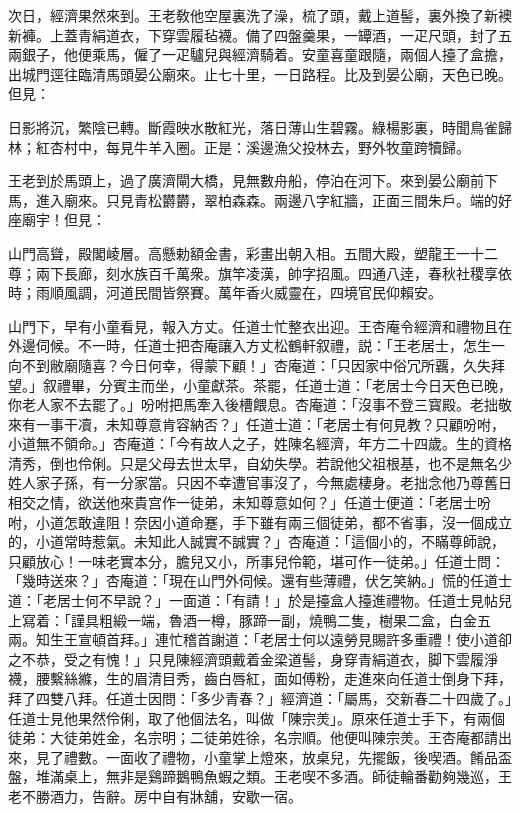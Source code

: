 次日，經濟果然來到。王老敎他空屋裏洗了澡，梳了頭，戴上道髻，裏外換了新襖新褲。上蓋青絹道衣，下穿雲履毡襪。備了四盤羹果，一罈酒，一疋尺頭，封了五兩銀子，他便乘馬，僱了一疋驢兒與經濟騎着。安童喜童跟隨，兩個人擡了盒擔，出城門逕往臨清馬頭晏公廟來。止七十里，一日路程。比及到晏公廟，天色已晚。但見：

\begin{myquote}
日影將沉，繁陰已轉。斷霞映水散紅光，落日薄山生碧霧。綠楊影裏，時聞鳥雀歸林；紅杏村中，每見牛羊入圈。正是：溪邊漁父投林去，野外牧童跨犢歸。
\end{myquote}

王老到於馬頭上，過了廣濟閘大橋，見無數舟船，停泊在河下。來到晏公廟前下馬，進入廟來。只見青松欝欝，翠柏森森。兩邊八字紅牆，正面三間朱戶。端的好座廟宇！但見：

\begin{myquote}
山門高聳，殿閣崚層。高懸勅額金書，彩畫出朝入相。五間大殿，塑龍王一十二尊；兩下長廊，刻水族百千萬衆。旗竿凌漢，帥字招風。四通八逹，春秋社稷享依時；雨順風調，河道民間皆祭賽。萬年香火威靈在，四境官民仰賴安。
\end{myquote}

山門下，早有小童看見，報入方丈。任道士忙整衣出迎。王杏庵令經濟和禮物且在外邊伺候。不一時，任道士把杏庵讓入方丈松鶴軒叙禮，説：「王老居士，怎生一向不到敝廟隨喜？今日何幸，得蒙下顧！」杏庵道：「只因家中俗冗所覊，久失拜望。」叙禮畢，分賓主而坐，小童獻茶。茶罷，任道士道：「老居士今日天色已晚，你老人家不去罷了。」吩咐把馬牽入後槽餵息。杏庵道：「沒事不登三寳殿。老拙敬來有一事干凟，未知尊意肯容納否？」任道士道：「老居士有何見教？只顧吩咐，小道無不領命。」杏庵道：「今有故人之子，姓陳名經濟，年方二十四歲。生的資格清秀，倒也伶俐。只是父母去世太早，自幼失學。若說他父祖根基，也不是無名少姓人家子孫，有一分家當。只因不幸遭官事沒了，今無處棲身。老拙念他乃尊舊日相交之情，欲送他來貴宫作一徒弟，未知尊意如何？」任道士便道：「老居士吩咐，小道怎敢違阻！奈因小道命蹇，手下雖有兩三個徒弟，都不省事，沒一個成立的，小道常時惹氣。未知此人誠實不誠實？」杏庵道：「這個小的，不瞞尊師說，只顧放心！一味老實本分，膽兒又小，所事兒伶範，堪可作一徒弟。」任道士問：「幾時送來？」杏庵道：「現在山門外伺候。還有些薄禮，伏乞笑納。」慌的任道士道：「老居士何不早說？」一面道：「有請！」於是擡盒人擡進禮物。任道士見帖兒上寫着：「謹具粗緞一端，魯酒一樽，豚蹄一副，燒鴨二隻，樹果二盒，白金五兩。知生王宣頓首拜。」連忙稽首謝道：「老居士何以遠勞見賜許多重禮！使小道卻之不恭，受之有愧！」只見陳經濟頭戴着金梁道髻，身穿青絹道衣，脚下雲履淨襪，腰繫絲縧，生的眉清目秀，齒白唇紅，面如傅粉，走進來向任道士倒身下拜，拜了四雙八拜。任道士因問：「多少青春？」經濟道：「屬馬，交新春二十四歲了。」任道士見他果然伶俐，取了他個法名，叫做「陳宗羙」。原來任道士手下，有兩個徒弟：大徒弟姓金，名宗明；二徒弟姓徐，名宗順。他便叫陳宗羙。王杏庵都請出來，見了禮數。一面收了禮物，小童掌上燈來，放桌兒，先擺飯，後喫酒。餚品盃盤，堆滿桌上，無非是鷄蹄鵝鴨魚蝦之類。王老喫不多酒。師徒輪番勸夠幾巡，王老不勝酒力，告辭。房中自有牀舖，安歇一宿。

